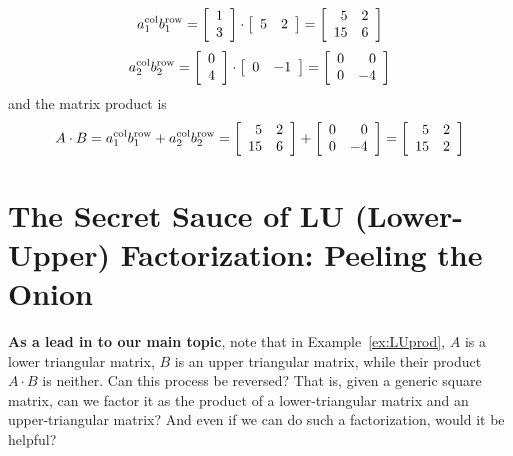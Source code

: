 $$
a_1^{\rm col}  b_1^{\rm row}= \left[\begin{array}{c} 1 \\
3  \end{array}\right] \cdot \left[\begin{array}{cc}5 & 2 \end{array}\right] = \left[\begin{array}{rr} 5 & 2\\
15 & 6 \end{array}\right]$$
%
$$
a_2^{\rm col}  b_2^{\rm row}= \left[\begin{array}{c} 0\\
4 \end{array}\right] \cdot \left[\begin{array}{rr}0 & -1 \end{array}\right] = \left[\begin{array}{rr} 0 & 0\\
0 & -4 \end{array}\right]$$
and the matrix product is
%
$$A\cdot B=a_1^{\rm col}  b_1^{\rm row} + a_2^{\rm col}  b_2^{\rm row} = \left[\begin{array}{rr} 5 & 2\\
15 & 6 \end{array}\right] + \left[\begin{array}{rr} 0 & 0\\
0 & -4 \end{array}\right]=\left[\begin{array}{rr} 5 & 2\\
15 & 2 \end{array}\right]$$

\Qed



\section{The Secret Sauce of LU (Lower-Upper) Factorization: Peeling the Onion}
\label{sec:SecretSauceLU}

\textbf{As a lead in to our main topic}, note that in Example~\ref{ex:LUprod}, $A$ is a lower triangular matrix, $B$ is an upper triangular matrix, while their product $A\cdot B$ is neither. Can this process be reversed? That is, given a generic square matrix, can we factor it as the product of a lower-triangular matrix and an upper-triangular matrix? And even if we can do such a factorization, would it be helpful?\\

